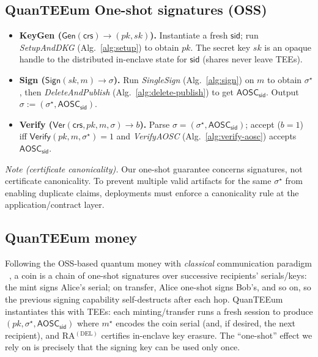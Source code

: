 \documentclass[runningheads,orivec]{llncs}
\newcommand{\prot}{\textsf{QuanTEEum}}
\newcommand{\sid}{\mathsf{sid}}
\begin{document}
\subsection{\prot{} One-shot signatures (OSS)}\label{sec:app-oss}
\begin{itemize}[leftmargin=*,itemsep=0.25em]
  \item \textbf{KeyGen (\(\mathsf{Gen}(\mathsf{crs})\!\to\!(pk,sk)\)).} Instantiate a fresh \(\sid\); run \emph{SetupAndDKG} (Alg.~\ref{alg:setup}) to obtain \(pk\). The secret key \(sk\) is an opaque handle to the distributed in-enclave state for \(\sid\) (shares never leave TEEs).
  \item \textbf{Sign (\(\mathsf{Sign}(sk,m)\!\to\!\sigma\)).} Run \emph{SingleSign} (Alg.~\ref{alg:sign}) on \(m\) to obtain \(\sigma^{\star}\), then \emph{DeleteAndPublish} (Alg.~\ref{alg:delete-publish}) to get \(\mathsf{AOSC}_{\sid}\). Output \(\sigma := (\sigma^{\star}, \mathsf{AOSC}_{\sid})\).
  \item \textbf{Verify (\(\mathsf{Ver}(\mathsf{crs},pk,m,\sigma)\!\to\! b\)).} Parse \(\sigma=(\sigma^{\star},\mathsf{AOSC}_{\sid})\); accept (\(b{=}1\)) iff \(\mathsf{Verify}(pk,m,\sigma^{\star})=1\) and \emph{VerifyAOSC} (Alg.~\ref{alg:verify-aosc}) accepts \(\mathsf{AOSC}_{\sid}\).
\end{itemize}
\emph{Note (certificate canonicality).} Our one-shot guarantee concerns signatures, not certificate canonicality. To prevent multiple valid artifacts for the same $\sigma^{\star}$ from enabling duplicate claims, deployments must enforce a canonicality rule at the application/contract layer.

\subsection{QuanTEEum money}
Following the OSS-based quantum money with \emph{classical} communication paradigm ~\cite{shmueli2025one}, a coin is a chain of one-shot signatures over successive recipients’ serials/keys: the mint signs Alice’s serial; on transfer, Alice one-shot signs Bob’s, and so on, so the previous signing capability self-destructs after each hop. \prot{} instantiates this with TEEs: each minting/transfer runs a fresh session to produce $(pk,\sigma^{\star},\mathsf{AOSC}_\sid)$ where $m^{\star}$ encodes the coin serial (and, if desired, the next recipient), and RA$^{(\mathrm{DEL})}$ certifies in-enclave key erasure. The “one-shot” effect we rely on is precisely that the signing key can be used only once.
\end{document}
